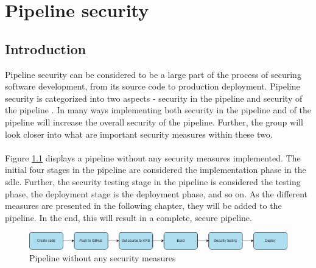 \chapter{Pipeline security}
\label{Pipeline security}
\section{Introduction}
Pipeline security can be considered to be a large part of the process of securing software development, from its source code to production deployment. Pipeline security is categorized into two aspects - security in the pipeline and security of the pipeline \cite{inofpipeline}. In many ways implementing both security in the pipeline and of the pipeline will increase the overall security of the pipeline. Further, the group will look closer into what are important security measures within these two. 
\\~\\
Figure \ref{fig: Pipeline without any security measures} displays a \gls{pipeline} without any security measures implemented. The initial four stages in the pipeline are considered the implementation phase in the \acrshort{sdlc}. Further, the security testing stage in the pipeline is considered the testing phase, the deployment stage is the deployment phase, and so on. As the different measures are presented in the following chapter, they will be added to the pipeline. In the end, this will result in a complete, secure pipeline.

\vspace{2mm}
\begin{figure}[H]
    \centering
    \includegraphics[width=0.8\columnwidth]{Images/SecurePipeline-Page-3.drawio.png}
    \caption{Pipeline without any security measures}
    \label{fig: Pipeline without any security measures}
\end{figure}




